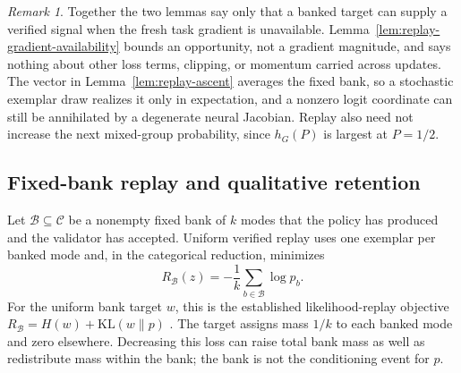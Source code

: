 \documentclass{article}
\newcommand{\1}{\mathbf 1}
\theoremstyle{remark}
\newtheorem{remark}[lemma]{Remark}
\theoremstyle{definition}
\theoremstyle{plain}
\begin{document}
\begin{remark}
Together the two lemmas say only that a banked target can supply a verified
signal when the fresh task gradient is unavailable. Lemma~\ref{lem:replay-gradient-availability}
bounds an opportunity, not a gradient magnitude, and says nothing about other
loss terms, clipping, or momentum carried across updates. The vector in
Lemma~\ref{lem:replay-ascent} averages the fixed bank, so a stochastic
exemplar draw realizes it only in expectation, and a nonzero logit coordinate
can still be annihilated by a degenerate neural Jacobian. Replay also need not
increase the next mixed-group probability, since $h_G(P)$ is largest at
$P=1/2$.
\end{remark}

\subsection{Fixed-bank replay and qualitative retention}
\label{app:theory-replay}

Let $\mathcal B\subseteq\mathcal C$ be a nonempty fixed bank of $k$ modes that
the policy has produced and the validator has accepted. Uniform verified replay
uses one exemplar per banked mode and, in the categorical reduction, minimizes
\begin{equation}
  R_{\mathcal B}(z)
  =-\frac1k\sum_{b\in\mathcal B}\log p_b.
  \label{eq:verified-replay-loss}
\end{equation}
For the uniform bank target $w$, this is the established likelihood-replay
objective $R_{\mathcal B}=H(w)+\mathrm{KL}(w\|p)$
\citep[App.~D.1, version~4]{li2025divergence}. The target assigns mass
$1/k$ to each banked mode and zero elsewhere. Decreasing this loss can raise
total bank mass as well as redistribute mass within the bank; the bank is
not the conditioning event for $p$.
\end{document}
